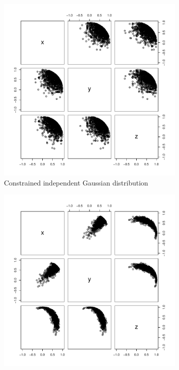 \documentclass[10pt]{article}
\DeclareMathOperator{\1}{\mathbbm{1}}
\begin{document}
\begin{figure}[H]
\begin{subfigure}[b]{0.30\textwidth}
\includegraphics[width=1\textwidth]{sphere_vmf}
\caption{Constrained independent Gaussian distribution}
\end{subfigure}
\begin{subfigure}[b]{0.30\textwidth}
\includegraphics[width=1\textwidth]{sphere_fb}

\end{subfigure}
\end{figure}
\end{document}
